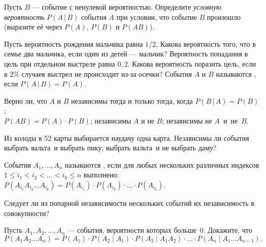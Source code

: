 \documentclass[a4paper,11pt]{article}
\begin{document}





Пусть $B$ --- событие с ненулевой вероятностью. Определите {\em условную вероятность} $ P (A\,|\,B)$ события $A$ при условии,
что событие $B$ произошло (выразите е\"е через $P(A)$, $P(B)$ и $P(AB)$).


Пусть вероятность рождения мальчика равна $1/2$.
Какова вероятность того, что в семье два мальчика, если один
из детей --- мальчик?
%
Вероятность попадания в цель при отдельном выстреле равна $0{,}2$.
Какова вероятность поразить цель, если в $2\%$  случаев выстрел не происходит из-за осечки?
%
События $A$ и $B$ называются , если
$ P (A\,|\,B)= P (A)$.
%

Верно ли, что $A$ и $B$ независимы тогда и только тогда, когда
 $ P (B\,|\,A)= P (B)$;\\
 $ P (AB)= P (A)\cdot P (B)$;
 независимы $A$ и  не $B$;
 независимы  не $A$\ и~ не~$B$.
%

Из колоды в 52 карты выбирается наудачу одна карта. Независимы ли события\\
 выбрать вальта\ и  выбрать пику;
 выбрать вальта\ и  не выбрать даму?


События $A_1,\dots,A_n$ называются , если
для любых нескольких различных индексов $1\le i_1<i_2<\dots<i_k\le n$ выполнено:
$P(A_{i_1}A_{i_2}\dots A_{i_k})=P(A_{i_1})\cdot P(A_{i_2})\cdot\dots\cdot P(A_{i_k})$.

Следует ли из попарной независимости нескольких событий их независимость в совокупности?

Пусть $A_1,A_2,\ldots,A_n$ --- события, вероятности которых больше~0.
Докажите, что
$P(A_1 A_2\dots A_n) = P(A_1)\cdot P(A_2\mid A_1)\cdot P(A_3 \mid A_1 A_2)\cdot\ldots\cdot P(A_n \mid A_1\dots A_{n-1}).$
\end{document}
